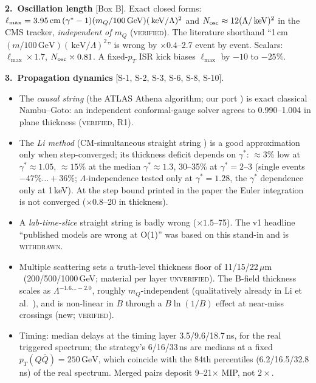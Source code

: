 \documentclass[11pt,a4paper]{article}
\newcommand{\UNV}{\textsc{unverified}}
\newcommand{\VER}{\textsc{verified}}
\newcommand{\WD}{\textcolor{bad}{\textsc{withdrawn}}}
\DeclareRobustCommand{\file}[1]{\path{#1}}
\newcommand{\mQ}{m_Q}
\newcommand{\GeV}{\ensuremath{\,\mathrm{GeV}}}
\newcommand{\keV}{\ensuremath{\,\mathrm{keV}}}
\newcommand{\pTQQ}{p_T(Q\bar Q)}
\newcommand{\um}{\ensuremath{\,\mu\mathrm{m}}}
\newcommand{\gst}{\gamma^*}
\newcommand{\lmax}{\ell_{\max}}
\newcommand{\src}[1]{{\color{mid}[#1]}}
\begin{document}
{\textbf{2.\ Oscillation length} \src{Box B}. Exact closed forms: $\lmax=3.95\,{\rm cm}\,(\gst-1)(\mQ/100\GeV)(\keV/\Lambda)^2$ and $N_{\rm osc}\approx12(\Lambda/\keV)^2$ in the CMS tracker, \emph{independent of $\mQ$} (\VER{}). The literature shorthand ``1\,cm$(m/100\GeV)(\keV/\Lambda)^2$'' is wrong by $\times0.4$--2.7 event by event. Scalars: $\lmax\times1.7$, $N_{\rm osc}\times0.81$. A fixed-$p_T$ ISR kick biases $\lmax$ by $-10$ to $-25\%$.

\textbf{3.\ Propagation dynamics} \src{S-1, S-2, S-3, S-6, S-8, S-10}.
\begin{itemize}[leftmargin=1.2em,itemsep=0pt,topsep=1pt]
\item The \emph{causal string} (the ATLAS Athena algorithm; our port \file{code/T3_causal.py}) is exact classical Nambu--Goto: an independent conformal-gauge solver agrees to 0.990--1.004 in plane thickness (\VER{}, R1).
\item The \emph{Li method} (CM-simultaneous straight string \cite{LiLi,traj}) is a good approximation only when step-converged; its thickness deficit depends on $\gst$: $\approx3\%$ low at $\gst\approx1.05$, $\approx15\%$ at the median $\gst\approx1.3$, 30--35\% at $\gst=2$--3 (single events $-47\%\ldots+36\%$; $\Lambda$-independence tested only at $\gst=1.28$, the $\gst$ dependence only at 1\,keV). At the step bound printed in the paper the Euler integration is not converged ($\times0.8$--20 in thickness).
\item A \emph{lab-time-slice} straight string is badly wrong ($\times1.5$--75). The v1 headline ``published models are wrong at O(1)'' was based on this stand-in and is \WD{}.
\item Multiple scattering sets a truth-level thickness floor of 11/15/22\um\ (200/500/1000\,GeV; material per layer \UNV{}). The B-field thickness scales as $\Lambda^{-1.6\ldots-2.0}$, roughly $\mQ$-independent (qualitatively already in Li et al.\ \cite{traj}), and is non-linear in $B$ through a $B\ln(1/B)$ effect at near-miss crossings (new; \VER{}).
\item Timing: median delays at the timing layer 3.5/9.6/18.7\,ns, for the real triggered spectrum; the strategy's 6/16/33\,ns are medians at a fixed $\pTQQ=250\GeV$, which coincide with the 84th percentiles (6.2/16.5/32.8\,ns) of the real spectrum. Merged pairs deposit 9--21$\times$ MIP, not $2\times$.
\end{itemize}

}
\end{document}

